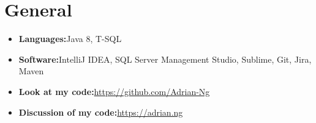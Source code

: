 \documentclass[letterpaper,11pt]{article}
\newcommand{\resumeSubHeadingListStart}{\begin{itemize}[leftmargin=*]}
\newcommand{\resumeSubHeadingListEnd}{\end{itemize}}
\begin{document}
	\section{General}
	\resumeSubHeadingListStart
	\item{
		\textbf{Languages:}{\hfill Java 8, T-SQL}	
		\vspace{-5pt}	
	}

	\item{
		\textbf{Software:}{\hfill IntelliJ IDEA, SQL Server Management Studio, Sublime, Git, Jira, Maven}
		\vspace{-5pt}		
	}
	
	\item{
		\textbf{Look at my code:}{\hfill \href{https://github.com/Adrian-Ng}{https://github.com/Adrian-Ng}}
		\vspace{-5pt}	
	}

	\item{
		\textbf{Discussion of my code:}{\hfill \href{https://adrian.ng}{https://adrian.ng}}
		\vspace{-5pt}
	}
	
	\resumeSubHeadingListEnd
	
	
\end{document}
